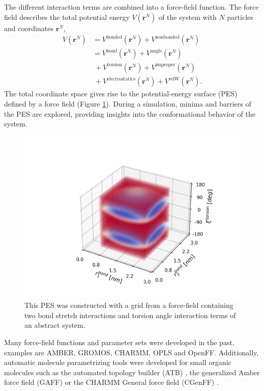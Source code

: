The different interaction terms are combined into a force-field function. The force field describes the total potential energy $V(\textbf{r}^N)$ of the system with $N$ particles and coordinates $\textbf{r}^N$, \cite{Levitt1969} 
\begin{equation}
\begin{split}
    V(\textbf{r}^N) &= V^\text{bonded}(\textbf{r}^N) + V^\text{nonbonded}(\textbf{r}^N)\\
          &= V^\text{bond}(\textbf{r}^N) + V^\text{angle}(\textbf{r}^N) \\
          &~ + V^\text{torsion}(\textbf{r}^N) + V^\text{improper}(\textbf{r}^N) \\
          &~ + V^\text{electrostatics}(\textbf{r}^N) + V^\text{vdW}(\textbf{r}^N) .
\end{split}
\end{equation}
The total coordinate space gives rise to the potential-energy surface (PES) defined by a force field (Figure \ref{fig:ffPES}).
During a simulation, minima and barriers of the PES are explored, providing insights into the conformational behavior of the system.

\begin{figure}
    \centering
    \includegraphics[width=\textwidth]{2_chapter_intro/fig/ForceField/bondterms.png}
    \caption{This PES was constructed with a grid from a force-field containing two bond stretch interactions and torsion angle interaction terms of an abstract system.}
    \label{fig:ffPES}
\end{figure}

Many force-field functions and parameter sets were developed in the past, examples are AMBER\cite{Weiner1981, Pearlman1995, Cornell1995, Lindorfflarsen2010}, GROMOS\cite{Daura1998, Oostenbrink2004, Schuler2001, Schmid2011,Malde2011, Stroet2018}, CHARMM\cite{Brooks1983, Mackerell1995, Mackerell1998}, OPLS \cite{Jorgensen1988, Jorgensen1996} and OpenFF.\cite{Qiu2021}
Additionally, automatic molecule parametrizing tools were developed for small organic molecules such as the automated topology builder (ATB) \cite{Malde2011, Stroet2018}, the generalized Amber force field (GAFF)\cite{Sprenger2015} or the CHARMM General force field (CGenFF) \cite{Vanommeslaeghe2010}.

